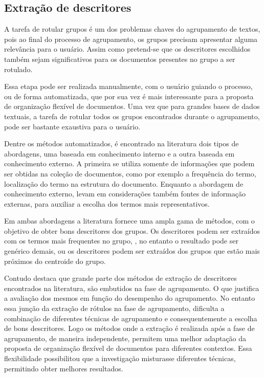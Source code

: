 \subsection{Extração de descritores}

A tarefa de rotular grupos é um dos problemas chaves do agrupamento de textos, 
pois ao final do processo de agrupamento, os grupos precisam apresentar alguma relevância para 
o usuário\cite{Zhang2008}. Assim como pretend-se que os descritores escolhidos também sejam 
significativos para os documentos presentes no grupo a ser rotulado. 

Essa etapa pode ser realizada manualmente, com o usuário guiando o processo, ou de forma 
automatizada, que por sua vez é mais interessante para a proposta de organização flexível de 
documentos. Uma vez que para grandes bases de dados textuais, a tarefa de rotular todos os grupos
encontrados durante o agrupamento, pode ser bastante exaustiva para o usuário.

Dentre os métodos automatizados, é encontrado na literatura dois tipos de abordagens, uma 
baseada em conhecimento interno e a outra baseada em conhecimento externo\cite{Nogueira2013}. 
A primeira se utiliza somente de informações que podem ser obtidas na coleção de documentos, 
como por exemplo a frequência do termo, localização do termo na estrutura do documento.
Enquanto a abordagem de conhecimento externo, levam em considerações também fontes de informação
externas, para auxiliar a escolha dos termos mais representativos. 

Em ambas abordagens a literatura fornece uma ampla gama de métodos, com o objetivo de obter bons
descritores dos grupos. Os descritores podem ser extraídos com os termos mais frequentes no grupo,
, no entanto o resultado pode ser genérico demais\cite{Pucktada2006}, ou os descritores podem
ser extraídos dos grupos que estão mais próximos do centroide do grupo.

Contudo \cite{Nogueira2013} destaca que grande parte dos métodos de extração de descritores 
encontrados na literatura, são embutidos na fase de agrupamento. O que justifica a avaliação 
dos mesmos em função do desempenho do agrupamento. No entanto essa junção da extração de rótulos
na fase de agrupamento, dificulta a combinação de diferentes técnicas de agrupamento e 
consequentemente a escolha de bons descritores. Logo os métodos onde a extração é realizada 
após a fase de agrupamento,
de maneira independente, permitem uma melhor adaptação da proposta de organização flexível de 
documentos para diferentes contextos. Essa flexibilidade possibilitou que a investigação
misturasse diferentes técnicas, permitindo obter melhores resultados.





